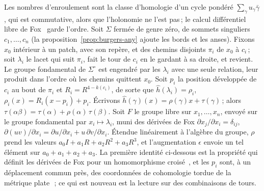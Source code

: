 \documentclass[11pt,a4paper]{article}
\begin{document}
Les nombres d'enroulement sont la classe d'homologie d'un cycle pondéré
$\sum_\gamma u_\gamma \bar\gamma$, qui est commutative, alors que l'holonomie
ne l'est pas\,; le calcul différentiel libre de Fox~\cite{fox1953free} garde
l'ordre. Soit $\Sigma$ fermée de genre zéro, de sommets singuliers $c_1,
\dots, c_n$ (la proposition~\ref{prop:burgers-any} ajoute les bords et les
anses). Fixons $x_0$ intérieur à un patch, avec son repère, et des chemins
disjoints $\pi_i$ de $x_0$ à $c_i$\,; soit $\lambda_i$ le lacet qui suit
$\pi_i$, fait le tour de $c_i$ en le gardant à sa droite, et revient. Le
groupe fondamental de $\Sigma^\circ$ est engendré par les $\lambda_i$ avec une
seule relation, leur produit dans l'ordre où les chemins quittent $x_0$. Soit
$p_i$ la position développée de $c_i$ au bout de $\pi_i$ et $R_i = R^{4 -
k(c_i)}$, de sorte que $\hat h(\lambda_i) = \rho_i$, $\rho_i(x) = R_i(x - p_i)
+ p_i$. Écrivons $\hat h(\gamma)(x) = \rho(\gamma)x + \tau(\gamma)$\,; alors
$\tau(\alpha\beta) = \tau(\alpha) + \rho(\alpha)\,\tau(\beta)$. Soit $F$ le
groupe libre sur $x_1, \dots, x_n$, envoyé sur le groupe fondamental par $x_i
\mapsto \lambda_i$, muni des dérivées de Fox $\partial x_j/\partial x_i =
\delta_{ij}$, $\partial(uv)/\partial x_i = \partial u/\partial x_i +
u\,\partial v/\partial x_i$. Étendue linéairement à l'algèbre du groupe,
$\rho$ prend les valeurs $a_0 I + a_1 R + a_2 R^2 + a_3 R^3$, et
l'augmentation $\epsilon$ envoie un tel élément sur $a_0 + a_1 + a_2 + a_3$.
La première identité ci-dessous est la propriété qui définit les dérivées de
Fox pour un homomorphisme croisé~\cite{fox1953free}, et les $p_i$ sont, à un
déplacement commun près, des coordonnées de cohomologie tordue de la métrique
plate~\cite{thurston1998shapes,veech1993flat}\,; ce qui est nouveau est la
lecture sur des combinaisons de tours.
\end{document}
